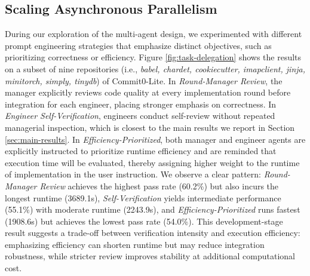 \subsection{Scaling Asynchronous Parallelism}

During our exploration of the multi-agent design, we experimented with different prompt engineering strategies that emphasize distinct objectives, such as prioritizing correctness or efficiency. Figure \ref{fig:task-delegation} shows the results on a subset of nine repositories (i.e., \emph{babel, chardet, cookiecutter, imapclient, jinja, minitorch, simply, tinydb}) of Commit0-Lite. In \textit{Round-Manager Review}, the manager explicitly reviews code quality at every implementation round before integration for each engineer, placing stronger emphasis on correctness. In \textit{Engineer Self-Verification}, engineers conduct self-review without repeated managerial inspection, which is closest to the main results we report in Section \ref{sec:main-results}. In \textit{Efficiency-Prioritized}, both manager and engineer agents are explicitly instructed to prioritize runtime efficiency and are reminded that execution time will be evaluated, thereby assigning higher weight to the runtime of implementation in the user instruction. We observe a clear pattern: \textit{Round-Manager Review} achieves the highest pass rate (60.2\%) but also incurs the longest runtime (3689.1s), \textit{Self-Verification} yields intermediate performance (55.1\%) with moderate runtime (2243.9s), and \textit{Efficiency-Prioritized} runs fastest (1908.6s) but achieves the lowest pass rate (54.0\%). This development-stage result suggests a trade-off between verification intensity and execution efficiency: emphasizing efficiency can shorten runtime but may reduce integration robustness, while stricter review improves stability at additional computational cost.

% 




